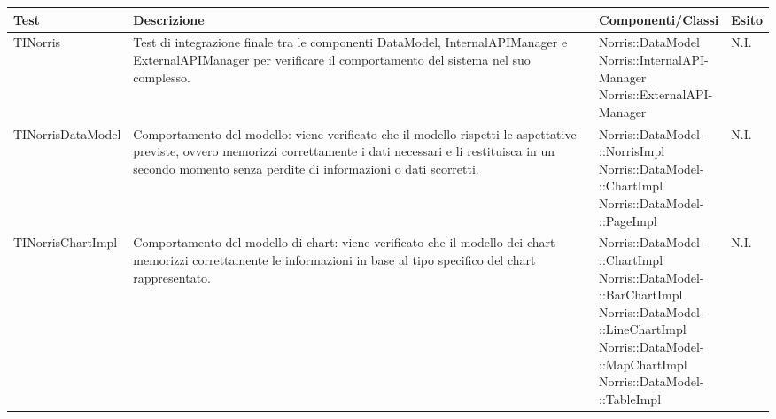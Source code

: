
\begin{longtabu}{| X | X | X[0.9] | X[0.3] |}

			\hline
			\rowfont{\bf}
			Test &
			Descrizione &
			Componenti/Classi &
			Esito \\
			\hline \endhead




	TINorris
	&
Test di integrazione finale tra le componenti DataModel, InternalAPIManager e ExternalAPIManager per verificare il comportamento del sistema nel suo complesso.
& \parbox[t]{0.6\textwidth}{
Norris::DataModel\\
Norris::InternalAPI-\\Manager\\
Norris::ExternalAPI-\\Manager}
			& N.I.
			\\ \hline



	TINorrisDataModel
	&
Comportamento del modello: viene verificato che il modello rispetti le aspettative previste, ovvero memorizzi correttamente i dati necessari e li restituisca in un secondo momento senza perdite di informazioni o dati scorretti.
& \parbox[t]{0.6\textwidth}{
Norris::DataModel-\\::NorrisImpl\\
Norris::DataModel-\\::ChartImpl\\
Norris::DataModel-\\::PageImpl}
			& N.I.
			\\ \hline



	TINorrisChartImpl
	&
Comportamento del modello di chart: viene verificato che il modello dei chart memorizzi correttamente le informazioni in base al tipo specifico del chart rappresentato.
& \parbox[t]{0.6\textwidth}{
Norris::DataModel-\\::ChartImpl\\
Norris::DataModel-\\::BarChartImpl\\
Norris::DataModel-\\::LineChartImpl\\
Norris::DataModel-\\::MapChartImpl\\
Norris::DataModel-\\::TableImpl}
			& N.I.
			\\ \hline




\end{longtabu}
